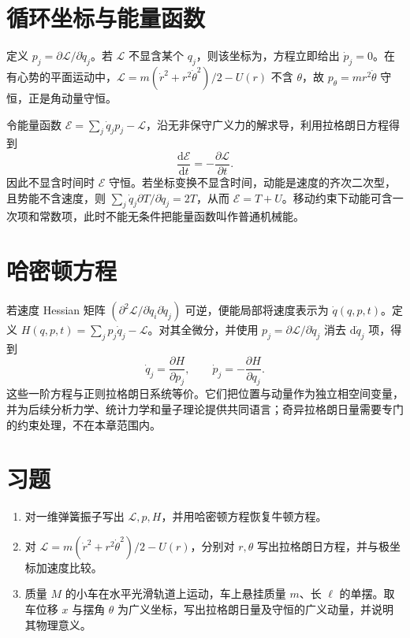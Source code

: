 \documentclass[UTF8,12pt,a4paper,fontset=fandol]{ctexbook}
\begin{document}
\section{循环坐标与能量函数}
定义 $p_j=\partial\mathcal L/\partial\dot q_j$。若 $\mathcal L$ 不显含某个 $q_j$，则该坐标为，方程立即给出 $\dot p_j=0$。在有心势的平面运动中，$\mathcal L=m(\dot r^2+r^2\dot\theta^2)/2-U(r)$ 不含 $\theta$，故 $p_\theta=mr^2\dot\theta$ 守恒，正是角动量守恒。

令能量函数 $\mathcal E=\sum_j\dot q_jp_j-\mathcal L$，沿无非保守广义力的解求导，利用拉格朗日方程得到
\begin{equation}
 \frac{\mathrm d\mathcal E}{\mathrm dt}=-\frac{\partial\mathcal L}{\partial t}.
 \label{eq:mech-lagrange-energy}
\end{equation}
因此不显含时间时 $\mathcal E$ 守恒。若坐标变换不显含时间，动能是速度的齐次二次型，且势能不含速度，则 $\sum_j\dot q_j\partial T/\partial\dot q_j=2T$，从而 $\mathcal E=T+U$。移动约束下动能可含一次项和常数项，此时不能无条件把能量函数叫作普通机械能。

\section{哈密顿方程}
若速度 Hessian 矩阵 $(\partial^2\mathcal L/\partial\dot q_i\partial\dot q_j)$ 可逆，便能局部将速度表示为 $\dot q(q,p,t)$。定义 $H(q,p,t)=\sum_jp_j\dot q_j-\mathcal L$。对其全微分，并使用 $p_j=\partial\mathcal L/\partial\dot q_j$ 消去 $\mathrm d\dot q_j$ 项，得到
\begin{equation}
 \dot q_j=\frac{\partial H}{\partial p_j},\qquad
 \dot p_j=-\frac{\partial H}{\partial q_j}.
 \label{eq:mech-hamilton}
\end{equation}
这些一阶方程与正则拉格朗日系统等价。它们把位置与动量作为独立相空间变量，并为后续分析力学、统计力学和量子理论提供共同语言；奇异拉格朗日量需要专门的约束处理，不在本章范围内。

\section{习题}
\begin{enumerate}[label=\thechapter.\arabic*,ref=\thechapter.\arabic*]
\item\label{exr:mech-lagrange-spring} 对一维弹簧振子写出 $\mathcal L,p,H$，并用哈密顿方程恢复牛顿方程。
\item\label{exr:mech-polar-lagrange} 对 $\mathcal L=m(\dot r^2+r^2\dot\theta^2)/2-U(r)$，分别对 $r,\theta$ 写出拉格朗日方程，并与极坐标加速度比较。
\item\label{exr:mech-sliding-pendulum} 质量 $M$ 的小车在水平光滑轨道上运动，车上悬挂质量 $m$、长 $\ell$ 的单摆。取车位移 $x$ 与摆角 $\theta$ 为广义坐标，写出拉格朗日量及守恒的广义动量，并说明其物理意义。
\end{enumerate}
\end{document}
